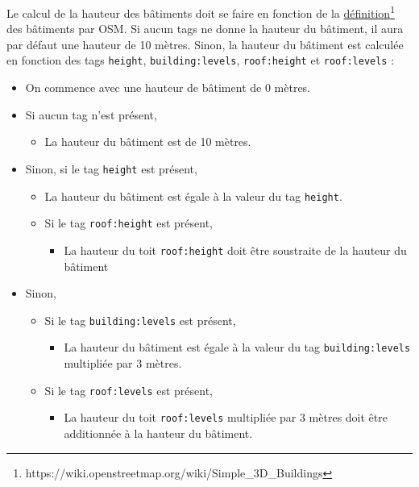 Le calcul de la hauteur des bâtiments doit se faire en fonction de la \href{https://wiki.openstreetmap.org/wiki/Simple_3D_Buildings}{définition}\footnote{https://wiki.openstreetmap.org/wiki/Simple\_3D\_Buildings} des bâtiments par OSM. Si aucun tags ne donne la hauteur du bâtiment, il aura par défaut une hauteur de 10 mètres. Sinon, la hauteur du bâtiment est calculée en fonction des tags \texttt{height}, \texttt{building:levels}, \texttt{roof:height} et \texttt{roof:levels} :

\begin{itemize}
    \item On commence avec une hauteur de bâtiment de 0 mètres.
    \item Si aucun tag n'est présent,
          \begin{itemize}
              \item La hauteur du bâtiment est de 10 mètres.
          \end{itemize}
    \item Sinon, si le tag \texttt{height} est présent,
          \begin{itemize}
              \item La hauteur du bâtiment est égale à la valeur du tag \texttt{height}.
              \item Si le tag \texttt{roof:height} est présent,
                    \begin{itemize}
                        \item La hauteur du toit \texttt{roof:height} doit être soustraite de la hauteur du bâtiment
                    \end{itemize}
          \end{itemize}
    \item Sinon,
          \begin{itemize}
              \item Si le tag \texttt{building:levels} est présent,
                    \begin{itemize}
                        \item La hauteur du bâtiment est égale à la valeur du tag \texttt{building:levels} multipliée par 3 mètres.
                    \end{itemize}
              \item Si le tag \texttt{roof:levels} est présent,
                    \begin{itemize}
                        \item La hauteur du toit \texttt{roof:levels} multipliée par 3 mètres doit être additionnée à la hauteur du bâtiment.
                    \end{itemize}
          \end{itemize}
\end{itemize}


